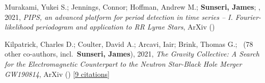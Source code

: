 \item Murakami, Yukei S.; Jennings, Connor; Hoffman, Andrew M.; \textbf{Sunseri, James}; \etal, 2021, \emph{PIPS, an advanced platform for period detection in time series -- I. Fourier-likelihood periodogram and application to RR Lyrae Stars}, ArXiv ()

\item Kilpatrick, Charles D.; Coulter, David A.; Arcavi, Iair; Brink, Thomas G.; \etal\ ({78} other co-authors, incl.\ \textbf{Sunseri, James}), 2021, \emph{The Gravity Collective: A Search for the Electromagnetic Counterpart to the Neutron Star-Black Hole Merger GW190814}, ArXiv () [\href{https://ui.adsabs.harvard.edu/abs/2021arXiv210606897K}{9 citations}]